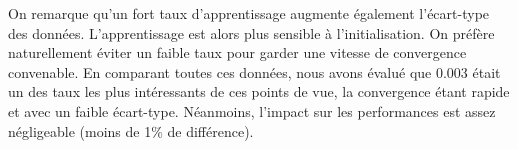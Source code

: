 On remarque qu'un fort taux d'apprentissage augmente également l'écart-type des données. L'apprentissage est alors plus sensible à l'initialisation. On préfère
naturellement éviter un faible taux pour garder une vitesse de convergence convenable. En comparant toutes ces données, nous avons évalué que 0.003 était un des taux 
les plus intéressants de ces points de vue, la convergence étant rapide et avec un faible écart-type. Néanmoins, l'impact sur les performances est assez négligeable
(moins de 1\% de différence).







